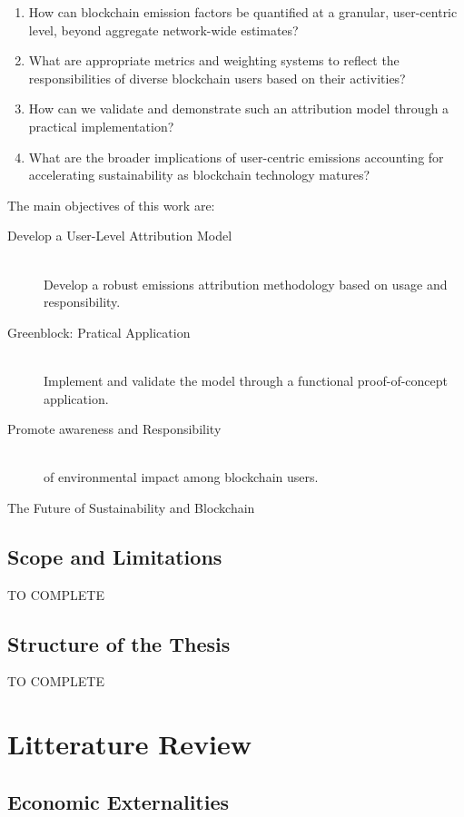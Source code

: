 \documentclass[11pt]{report}
\begin{document}
\begin{enumerate}
    \item How can blockchain emission factors be quantified at a granular, user-centric level, beyond aggregate network-wide estimates?
    \item What are appropriate metrics and weighting systems to reflect the responsibilities of diverse blockchain users based on their activities?
    \item How can we validate and demonstrate such an attribution model through a practical implementation?
    \item What are the broader implications of user-centric emissions accounting for accelerating sustainability as blockchain technology matures?
\end{enumerate}

The main objectives of this work are:

\begin{description}

    \item [Develop a User-Level Attribution Model] \hfill \\
          Develop a robust emissions attribution methodology based on usage and responsibility.
    \item [Greenblock: Pratical Application] \hfill \\
          Implement and validate the model through a functional proof-of-concept application.
    \item [Promote awareness and Responsibility] \hfill \\
          of environmental impact among blockchain users.
    \item [The Future of Sustainability and Blockchain] 
\end{description}

\section{Scope and Limitations}
TO COMPLETE


\section{Structure of the Thesis}
TO COMPLETE

\chapter{Litterature Review}
\section{Economic Externalities}
\end{document}
